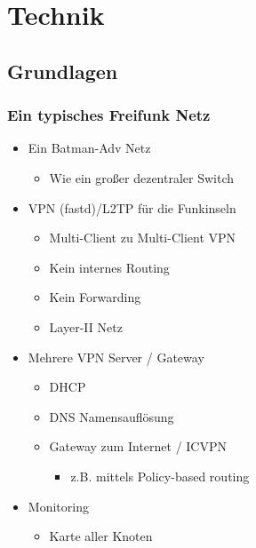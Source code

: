 \section{Technik}


\subsection{Grundlagen}
\begin{frame}
\frametitle{Ein typisches Freifunk Netz}
    \begin{itemize}
        \item Ein Batman-Adv Netz
        \begin{itemize}
            \item \glqq Wie ein großer dezentraler Switch\grqq 
        \end{itemize}
        \item VPN (fastd)/L2TP für die Funkinseln
        \begin{itemize}
            \item Multi-Client zu Multi-Client VPN
            \item Kein internes Routing
            \item Kein Forwarding
            \item Layer-II Netz
        \end{itemize}
        \item Mehrere VPN Server / Gateway
        \begin{itemize}
            \item DHCP
            \item DNS Namensauflösung
            \item Gateway zum Internet / ICVPN
            \begin{itemize}
                \item z.B. mittels Policy-based routing
            \end{itemize}
        \end{itemize}
        \item Monitoring
        \begin{itemize}
            \item Karte aller Knoten
        \end{itemize}
    \end{itemize}
\end{frame}

